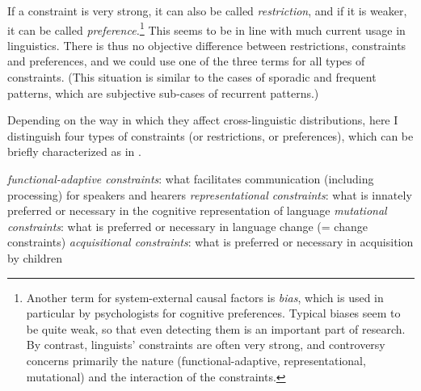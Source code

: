 \documentclass[output=paper]{langsci/langscibook}
\begin{document}
If a constraint is very strong, it can also be called \textit{restriction}, and if it is weaker, it can be called \textit{preference.}\footnote{Another term for system-external causal factors is \textit{bias}, which is used in particular by psychologists for cognitive preferences. Typical biases seem to be quite weak, so that even detecting them is an important part of research. By contrast, linguists’ constraints are often very strong, and controversy concerns primarily the nature (functional-adaptive, representational, mutational) and the interaction of the constraints.} This seems to be in line with much current usage in linguistics. There is thus no objective difference between restrictions, constraints and preferences, and we could use one of the three terms for all types of constraints. (This situation is similar to the cases of sporadic and frequent patterns, which are subjective sub-cases of recurrent patterns.)

Depending on the way in which they affect cross-linguistic distributions, here I distinguish four types of constraints (or restrictions, or preferences), which can be briefly characterized as in .

\ea\label{ex:haspelmath:2} 
  \ea \textit{functional-adaptive constraints}: what facilitates communication (including processing) for speakers and hearers
  \ex   \textit{representational constraints}: what is innately preferred or necessary in the cognitive representation of language
  \ex   \textit{mutational constraints}: what is preferred or necessary in language change (= change constraints)
  \ex   \textit{acquisitional constraints}:  what is preferred or necessary in acquisition by children
  \z
\z
\end{document}
